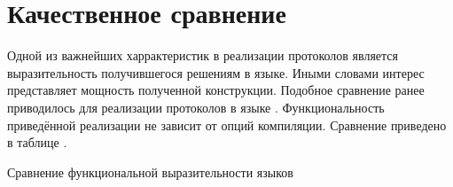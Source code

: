 \section{Качественное сравнение}
Одной из важнейших харрактеристик в реализации протоколов является выразительность получившегося решениям в языке. Иными словами интерес представляет мощность полученной конструкции. Подобное сравнение ранее приводилось для реализации протоколов в языке . Функциональность приведённой реализации не зависит от опций компиляции. Сравнение приведено в таблице \cite{features_comparison}.

\begin{table}
  \caption{Сравнение функциональной выразительности языков}
  \label{features_comparison}

\end{table}
